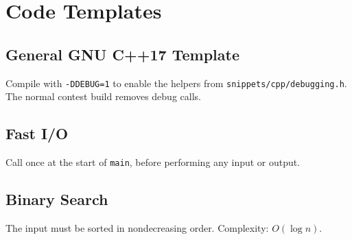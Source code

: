 \section{Code Templates}

\subsection{General GNU C++17 Template}

Compile with \texttt{-DDEBUG=1} to enable the helpers from
\texttt{snippets/cpp/debugging.h}. The normal contest build removes debug calls.


\subsection{Fast I/O}

Call once at the start of \texttt{main}, before performing any input or output.


\subsection{Binary Search}

The input must be sorted in nondecreasing order. Complexity: $O(\log n)$.

